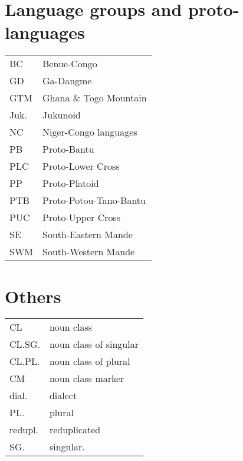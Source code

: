 
\section*{Language groups and proto-languages}

\begin{tabular}{ll}
BC  &  Benue-Congo     \\
GD  &  Ga\index{Ga!}{}-Dangme\index{Dangme!}\\
GTM  &  Ghana \& Togo Mountain              \\
Juk.  &  Jukunoid                         \\
NC  &  Niger-Congo languages              \\
PB\index{PB!}  &  Proto-Bantu\index{Proto-Bantu!}\\
PLC\index{PLC!}  &  Proto-Lower Cross\index{Proto-Lower Cross!}\\
PP\index{PP!}  &  Proto-Platoid\index{Proto-Platoid!}         \\
PTB\index{PTB!}  &  Proto-Potou-Tano\index{Proto-Potou-Tano!}{}-Bantu\\
PUC\index{PUC!}  &  Proto-Upper Cross\index{Proto-Upper Cross!}      \\
SE\index{SE!}  &  South-Eastern Mande   \\
SWM\index{SWM!}  &  South-Western Mande
\end{tabular}


\section*{Others}

\begin{tabular}{ll}
CL  &  noun class                     \\
CL.SG.  &  noun class of singular     \\
CL.PL.  & noun class of plural        \\
CM  &  noun class marker              \\
dial.   &  dialect                    \\
PL.  &  plural                        \\
redupl.  &  reduplicated              \\
SG.  &  singular.                     \\
\end{tabular}
